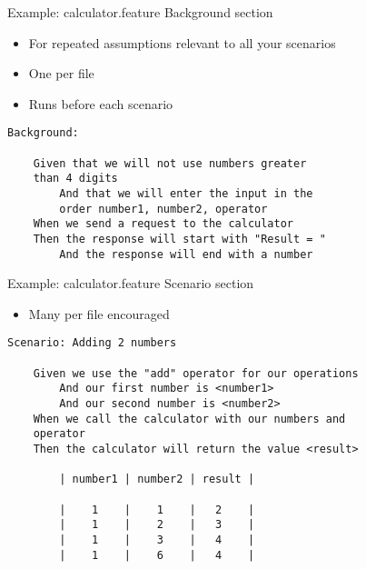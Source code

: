 \documentclass[bigger]{beamer}
\begin{document}
\begin{frame}[fragile,label={sec:orgc70da2e}]{Example: calculator.feature Background section}
 \begin{itemize}
\item For repeated assumptions relevant to all your scenarios
\item One per file
\item Runs before each scenario
\end{itemize}
\begin{verbatim}
Background:

    Given that we will not use numbers greater
    than 4 digits
        And that we will enter the input in the
        order number1, number2, operator
    When we send a request to the calculator
    Then the response will start with "Result = "
        And the response will end with a number

\end{verbatim}
\end{frame}


\begin{frame}[fragile,label={sec:orgee527c5}]{Example: calculator.feature Scenario section}
 \begin{itemize}
\item Many per file encouraged
\end{itemize}
\begin{verbatim}
Scenario: Adding 2 numbers

    Given we use the "add" operator for our operations
        And our first number is <number1>
        And our second number is <number2>
    When we call the calculator with our numbers and
    operator
    Then the calculator will return the value <result>

        | number1 | number2 | result |

        |    1    |    1    |   2    |
        |    1    |    2    |   3    |
        |    1    |    3    |   4    |
        |    1    |    6    |   4    |
\end{verbatim}
\end{frame}
\end{document}
